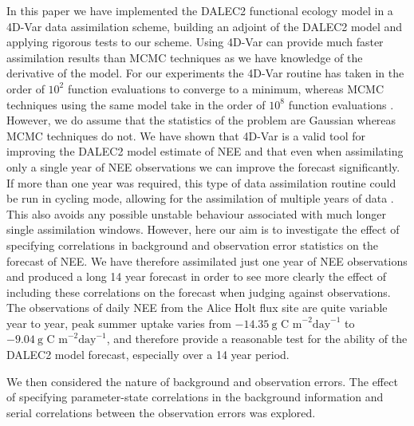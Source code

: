 In this paper we have implemented the DALEC2 functional ecology model in a 4D-Var data assimilation scheme, building an adjoint of the DALEC2 model and applying rigorous tests to our scheme. Using 4D-Var can provide much faster assimilation results than MCMC techniques as we have knowledge of the derivative of the model. For our experiments the 4D-Var routine has taken in the order of $10^{2}$ function evaluations to converge to a minimum, whereas MCMC techniques using the same model take in the order of $10^{8}$ function evaluations \citep{Bloom2015}. However, we do assume that the statistics of the problem are Gaussian whereas MCMC techniques do not. We have shown that 4D-Var is a valid tool for improving the DALEC2 model estimate of NEE and that even when assimilating only a single year of NEE observations we can improve the forecast significantly. If more than one year was required, this type of data assimilation routine could be run in cycling mode, allowing for the assimilation of multiple years of data \citep{moodycycled4dvar}. This also avoids any possible unstable behaviour associated with much longer single assimilation windows. However, here our aim is to investigate the effect of specifying correlations in background and observation error statistics on the forecast of NEE. We have therefore assimilated just one year of NEE observations and produced a long 14 year forecast in order to see more clearly the effect of including these correlations on the forecast when judging against observations. The observations of daily NEE from the Alice Holt flux site are quite variable year to year, peak summer uptake varies from $-14.35~\text{g C m}^{-2}\text{day}^{-1}$ to $-9.04~\text{g C m}^{-2}\text{day}^{-1}$, and therefore provide a reasonable test for the ability of the DALEC2 model forecast, especially over a 14 year period.  

We then considered the nature of background and observation errors. The effect of specifying parameter-state correlations in the background information and serial correlations between the observation errors was explored.

